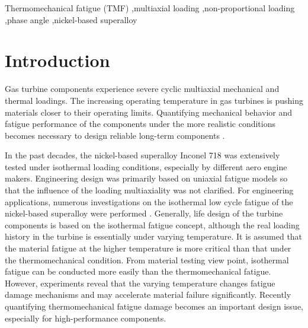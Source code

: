 \documentclass[preprint,5p,twocolumn,11pt,sort&compress]{elsarticle}
\begin{document}
\begin{frontmatter}
\begin{abstract}
\end{abstract}

%
\begin{keyword}
Thermomechanical fatigue (TMF) \sep multiaxial loading \sep non-proportional loading \sep phase angle \sep nickel-based superalloy

\end{keyword}
\end{frontmatter}

\section{Introduction}
Gas turbine components experience severe cyclic multiaxial mechanical and thermal loadings. The increasing operating temperature in gas turbines is pushing materials closer to their operating limits. Quantifying mechanical behavior and fatigue performance of the components under the more realistic conditions becomes necessary to design reliable long-term components  \cite{Harrison1996}.

In the past decades, the nickel-based superalloy Inconel 718 was extensively tested under isothermal loading conditions, especially by different aero engine makers. Engineering design was primarily based on uniaxial fatigue models so that the influence of the loading multiaxiality was not clarified.
For engineering applications, numerous investigations on the isothermal low cycle fatigue of the nickel-based superalloy were performed \cite{Koch85, Morrow88, Mahobia2014, Chen2016, William1995, kim1988elevated, nelson1992creep}. 
Generally, life design of the turbine components is based on the isothermal fatigue concept, although the real loading history in the turbine is essentially under varying temperature. It is assumed that the material fatigue at the higher temperature is more critical than that under the thermomechanical condition. From material testing view point, isothermal fatigue can be conducted more easily than the thermomechanical fatigue. However, experiments reveal that the varying temperature changes fatigue damage mechanisms and may accelerate material failure significantly. Recently quantifying thermomechanical fatigue damage becomes an important design issue, especially for high-performance components.
\end{document}
